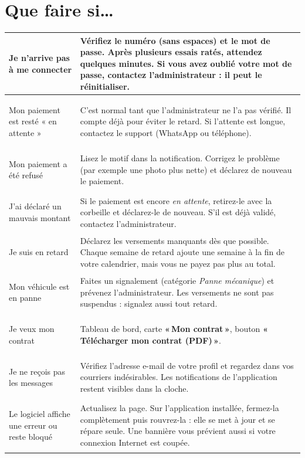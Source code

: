 \documentclass[11pt,a4paper]{article}
\newcommand{\bouton}[1]{\textbf{«\,#1\,»}}
\let\oldsection\section
\renewcommand{\section}{\clearpage\oldsection}
\begin{document}
\section{Que faire si\ldots}

\begin{center}
\begin{tabularx}{\linewidth}{@{}>{\bfseries\raggedright}p{4.4cm}X@{}}
\toprule
Je n'arrive pas à me connecter & Vérifiez le numéro (sans espaces) et le mot de passe. Après plusieurs essais ratés, attendez quelques minutes. Si vous avez oublié votre mot de passe, contactez l'administrateur : il peut le réinitialiser.\\
\midrule
Mon paiement est resté « en attente » & C'est normal tant que l'administrateur ne l'a pas vérifié. Il compte déjà pour éviter le retard. Si l'attente est longue, contactez le support (WhatsApp ou téléphone).\\
\midrule
Mon paiement a été refusé & Lisez le motif dans la notification. Corrigez le problème (par exemple une photo plus nette) et déclarez de nouveau le paiement.\\
\midrule
J'ai déclaré un mauvais montant & Si le paiement est encore \textit{en attente}, retirez-le avec la corbeille et déclarez-le de nouveau. S'il est déjà validé, contactez l'administrateur.\\
\midrule
Je suis en retard & Déclarez les versements manquants dès que possible. Chaque semaine de retard ajoute une semaine à la fin de votre calendrier, mais vous ne payez pas plus au total.\\
\midrule
Mon véhicule est en panne & Faites un signalement (catégorie \textit{Panne mécanique}) et prévenez l'administrateur. Les versements ne sont pas suspendus : signalez aussi tout retard.\\
\midrule
Je veux mon contrat & Tableau de bord, carte \bouton{Mon contrat}, bouton \bouton{Télécharger mon contrat (PDF)}.\\
\midrule
Je ne reçois pas les messages & Vérifiez l'adresse e-mail de votre profil et regardez dans vos courriers indésirables. Les notifications de l'application restent visibles dans la cloche.\\
\midrule
Le logiciel affiche une erreur ou reste bloqué & Actualisez la page. Sur l'application installée, fermez-la complètement puis rouvrez-la : elle se met à jour et se répare seule. Une bannière vous prévient aussi si votre connexion Internet est coupée.\\
\bottomrule
\end{tabularx}
\end{center}
\end{document}
